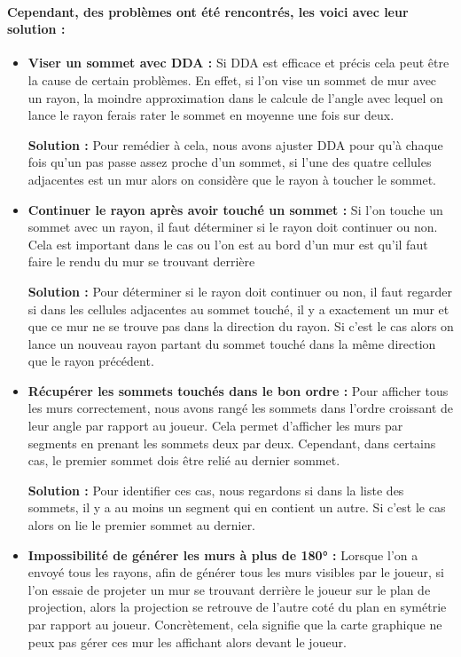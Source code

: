 \documentclass[12pt]{report}
\begin{document}
\paragraph{Cependant, des problèmes ont été rencontrés, les voici avec leur solution :}
\begin{itemize}
	\item \textbf{Viser un sommet avec DDA : } Si DDA est efficace et précis cela peut être la cause de certain problèmes. 
	En effet, si l'on vise un sommet de mur avec un rayon, la moindre approximation dans le calcule de l'angle avec lequel on 
	lance le rayon ferais rater le sommet en moyenne une fois sur deux.

	\textbf{Solution : }Pour remédier à cela, nous avons ajuster DDA pour qu'à chaque fois qu'un pas
	passe assez proche d'un sommet, si l'une des quatre cellules adjacentes est
	un mur alors on considère que le rayon à toucher le sommet.

	\item \textbf{Continuer le rayon après avoir touché un sommet :} Si l'on touche un sommet avec 
	un rayon, il faut déterminer si le rayon doit continuer ou non. Cela est important dans le cas ou l'on 
	est au bord d'un mur est qu'il faut faire le rendu du mur se trouvant derrière

	\textbf{Solution : }Pour déterminer si le rayon doit continuer ou non, il faut regarder si
	dans les cellules adjacentes au sommet touché, il y a exactement un mur et que ce mur
	ne se trouve pas dans la direction du rayon. Si c'est le cas alors on lance un nouveau rayon 
	partant du sommet touché dans la même direction que le rayon précédent.

	\item \textbf{Récupérer les sommets touchés dans le bon ordre :} Pour afficher tous les murs correctement,
	nous avons rangé les sommets dans l'ordre croissant de leur angle par rapport au joueur. Cela permet d'afficher
	les murs par segments en prenant les sommets deux par deux. Cependant, dans certains cas, le premier sommet 
	dois être relié au dernier sommet.

	\textbf{Solution : }Pour identifier ces cas, nous regardons si dans la liste des sommets, il y a au moins
	un segment qui en contient un autre. Si c'est le cas alors on lie le premier sommet au dernier.

	\item \textbf{Impossibilité de générer les murs à plus de 180° :} Lorsque l'on a envoyé tous les rayons,
	afin de générer tous les murs visibles par le joueur, si l'on essaie de projeter un mur se trouvant derrière
	le joueur sur le plan de projection, alors la projection se retrouve de l'autre coté du plan en symétrie 
	par rapport au joueur. Concrètement, cela signifie que la carte graphique ne peux pas gérer ces mur les
	affichant alors devant le joueur.


\end{itemize}
\end{document}
